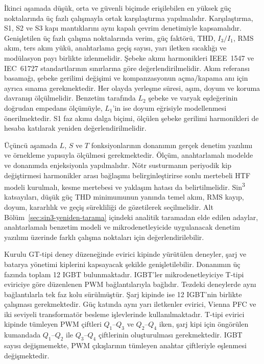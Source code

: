 İkinci aşamada düşük, orta ve güvenli biçimde erişilebilen en yüksek güç noktalarında üç fazlı çalışmayla ortak karşılaştırma yapılmalıdır. Karşılaştırma, S1, S2 ve S3 kapı mantıklarını aynı kapalı çevrim denetimiyle kapsamalıdır. Genişletilen üç fazlı çalışma noktalarında verim, güç faktörü, THD, $I_3/I_1$, RMS akım, ters akım yükü, anahtarlama geçiş sayısı, yarı iletken sıcaklığı ve modülasyon payı birlikte izlenmelidir. Şebeke akımı harmonikleri IEEE~1547 ve IEC~61727 standartlarının sınırlarına göre değerlendirilmelidir. Akım referansı basamağı, şebeke gerilimi değişimi ve kompanzasyonun açma/kapama anı için ayrıca sınama gerekmektedir. Her olayda yerleşme süresi, aşım, doyum ve koruma davranışı ölçülmelidir. Benzetim tarafında $L_2$ şebeke ve varyak eşdeğerinin doğrudan empedans ölçümüyle, $L_1$'in ise doyum eğrisiyle modellenmesi önerilmektedir. S1 faz akımı dalga biçimi, ölçülen şebeke gerilimi harmonikleri de hesaba katılarak yeniden değerlendirilmelidir.

Üçüncü aşamada $L$, $S$ ve $T$ fonksiyonlarının donanımın gerçek denetim yazılımı ve örnekleme yapısıyla ölçülmesi gerekmektedir. Ölçüm, anahtarlamalı modelde ve donanımda enjeksiyonla yapılmalıdır. Nötr susturmanın periyodik kip değiştirmesi harmonikler arası bağlaşımı belirginleştirirse sonlu mertebeli HTF modeli kurulmalı, kesme mertebesi ve yaklaşım hatası da belirtilmelidir. Sin\textsuperscript{3} katsayıları, düşük güç THD minimumunun yanında temel akım, RMS kayıp, doyum, kararlılık ve geçiş sürekliliği de gözetilerek seçilmelidir. Alt Bölüm~\ref{sec:sin3-yeniden-tarama} içindeki analitik taramadan elde edilen adaylar, anahtarlamalı benzetim modeli ve mikrodenetleyicide uygulanacak denetim yazılımı üzerinde farklı çalışma noktaları için değerlendirilebilir.

Kurulu GT-tipi deney düzeneğinde evirici kipinde yürütülen deneyler, şarj ve batarya yönetimi kiplerini kapsayacak şekilde genişletilebilir. Donanımın üç fazında toplam \num{12} IGBT bulunmaktadır. IGBT'ler mikrodenetleyiciye T-tipi eviriciye göre düzenlenen PWM bağlantılarıyla bağlıdır. Tezdeki deneylerde aynı bağlantılarla tek faz kolu sürülmüştür. Şarj kipinde ise \num{12} IGBT'nin birlikte çalışması gerekmektedir. Güç katında aynı yarı iletkenler evirici, Vienna PFC ve iki seviyeli transformatör besleme işlevlerinde kullanılmaktadır. T-tipi evirici kipinde tümleyen PWM çiftleri $Q_1$--$Q_3$ ve $Q_2$--$Q_4$ iken, şarj kipi için öngörülen kumandada $Q_1$--$Q_2$ ile $Q_3$--$Q_4$ çiftlerinin oluşturulması gerekmektedir. IGBT sayısı değişmemekte, PWM çıkışlarının tümleyen anahtar çiftleriyle eşlenmesi değişmektedir.

